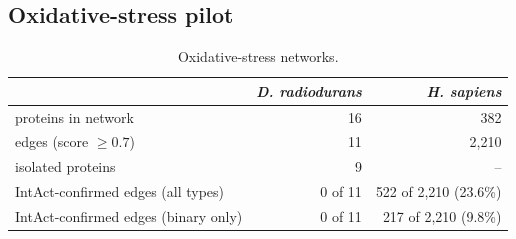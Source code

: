 \subsection{Oxidative-stress pilot}

\begin{table}[htbp]
\centering
\small
\begin{tabular}{lrr}
\toprule
 & \emph{D. radiodurans} & \emph{H. sapiens} \\
\midrule
proteins in network & 16 & 382 \\
edges (score $\geq 0.7$) & 11 & 2,210 \\
isolated proteins & 9 & -- \\
IntAct-confirmed edges (all types) & 0 of 11 & 522 of 2,210 (23.6\%) \\
IntAct-confirmed edges (binary only) & 0 of 11 & 217 of 2,210 (9.8\%) \\
\bottomrule
\end{tabular}
\caption{Oxidative-stress networks.}
\end{table}

